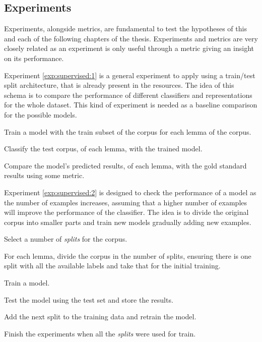 \subsection{Experiments}\label{sec:supervised:experiments}

Experiments, alongside metrics, are fundamental to test the hypotheses of this
and each of the following chapters of the thesis. Experiments and metrics are
very closely related as an experiment is only useful through a metric giving an
insight on its performance.

Experiment \ref{exp:supervised:1} is a general experiment to apply using a
train/test split architecture, that is already present in the resources. The
idea of this schema is to compare the performance of different classifiers and
representations for the whole dataset. This kind of experiment is needed as
a baseline comparison for the possible models.

\begin{experiment}\label{exp:supervised:1}
  \begin{enumexp}
    \item Train a model with the train subset of the corpus for each lemma of
      the corpus.
    \item Classify the test corpus, of each lemma, with the trained model.
    \item Compare the model's predicted results, of each lemma, with the gold
      standard results using some metric.
  \end{enumexp}
\end{experiment}

Experiment \ref{exp:supervised:2} is designed to check the performance of a
model as the number of examples increases, assuming that a higher number of
examples will improve the performance of the classifier. The idea is to divide
the original corpus into smaller parts and train new models gradually adding
new examples.

\begin{experiment}\label{exp:supervised:2}
  \begin{enumexp}
    \item Select a number of {\em splits} for the corpus.
    \item For each lemma, divide the corpus in the number of splits, ensuring
      there is one split with all the available labels and take that for
      the initial training.
    \item Train a model.
    \item Test the model using the test set and store the results.
    \item Add the next split to the training data and retrain the model.
    \item Finish the experiments when all the {\em splits} were used for train.
  \end{enumexp}
\end{experiment}

